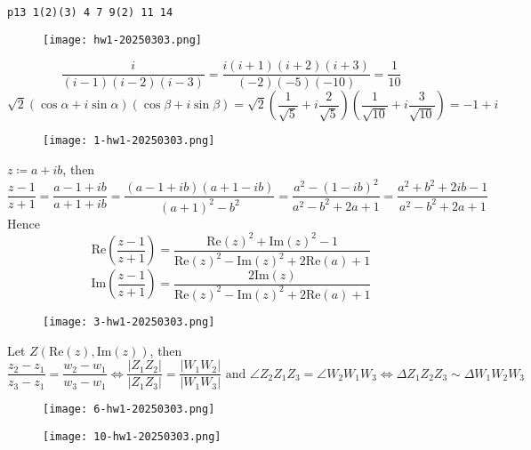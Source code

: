 \begin{lstlisting}
p13 1(2)(3) 4 7 9(2) 11 14 
\end{lstlisting}
\begin{exercise}
\begin{figure}[H]
\centering
\texttt{[image: hw1-20250303.png]}
\label{}
\end{figure}
\end{exercise}
\[
\frac{i}{(i-1)(i-2)(i-3)}=\frac{i(i+1)(i+2)(i+3)}{(-2)(-5)(-10)}= \frac{1}{10}
\]
\[
\sqrt{ 2 }(\cos\alpha+i\sin\alpha)(\cos\beta+i\sin\beta)=\sqrt{ 2 }\left( \frac{1}{\sqrt{ 5 }} +i \frac{2}{\sqrt{ 5 }}  \right)\left( \frac{1}{\sqrt{ 10 }} +i \frac{3}{\sqrt{ 10 }}  \right)=-1+i 
\]
\begin{exercise}
\begin{figure}[H]
\centering
\texttt{[image: 1-hw1-20250303.png]}
\label{}
\end{figure}
\end{exercise}
$z\coloneqq a+ib$, then
\[
\frac{z-1}{z+1}=\frac{a-1+ib}{a+1+ib}=\frac{(a-1+ib)(a+1-ib)}{(a+1)^{2}-b^{2}}=\frac{a^{2}-(1-ib)^{2}}{a^{2}-b^{2}+2a+1}=\frac{a^{2}+b^{2}+2ib-1}{a^{2}-b^{2}+2a+1}
\]
Hence
\[
\mathrm{Re}\left( \frac{z-1}{z+1} \right)=\frac{\mathrm{Re}(z)^{2}+\mathrm{Im}(z)^{2}-1}{\mathrm{Re}(z)^{2}-\mathrm{Im}(z)^{2}+2\mathrm{Re}(a)+1}
\]
\[
\mathrm{Im}\left( \frac{z-1}{z+1} \right)=\frac{2\mathrm{Im}(z)}{\mathrm{Re}(z)^{2}-\mathrm{Im}(z)^{2}+2\mathrm{Re}(a)+1}
\]
\begin{exercise}
\begin{figure}[H]
\centering
\texttt{[image: 3-hw1-20250303.png]}
\label{}
\end{figure}
\end{exercise}
Let $Z(\mathrm{Re}(z),\mathrm{Im}(z))$, then
\[
\frac{z_{2}-z_{1}}{z_{3}-z_{1}}=\frac{w_{2}-w_{1}}{w_{3}-w_{1}}\iff\frac{\lvert Z_{1}Z_{2} \rvert }{\lvert Z_1Z_{3} \rvert }=\frac{\lvert W_{1}W_{2} \rvert }{\lvert W_{1}W_{3} \rvert }\text{ and }\angle Z_{2}Z_{1}Z_{3}=\angle W_{2}W_{1}W_{3}\iff \Delta Z_{1}Z_{2}Z_{3}\sim \Delta W_{1}W_{2}W_{3}
\]
\begin{exercise}
\begin{figure}[H]
\centering
\texttt{[image: 6-hw1-20250303.png]}
\label{}
\end{figure}
\end{exercise}
\begin{definition}[棣莫弗公式]
\begin{figure}[H]
\centering
\texttt{[image: 10-hw1-20250303.png]}
\label{}
\end{figure}
\end{definition}
